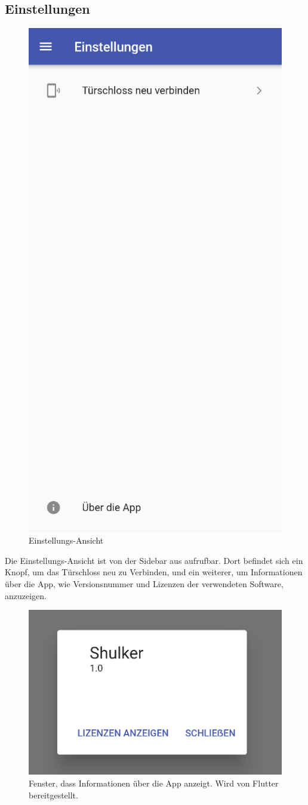 \subsection{Einstellungen}
\begin{figure}[H]
    \begin{center}
        \includegraphics[width=.4\textwidth]{images/mobile/Settings.png}
        \caption{Einstellungs-Ansicht}
    \end{center}
\end{figure}

Die Einstellungs-Ansicht ist von der Sidebar aus aufrufbar. Dort befindet sich ein Knopf, um das Türschloss neu
zu Verbinden, und ein weiterer, um Informationen über die App, wie Versionsnummer und Lizenzen der verwendeten
Software, anzuzeigen.

\begin{figure}[H]
    \begin{center}
        \includegraphics[width=.4\textwidth]{images/mobile/AboutTheApp.png}
        \caption{Fenster, dass Informationen über die App anzeigt. Wird von Flutter bereitgestellt. }
    \end{center}
\end{figure}

